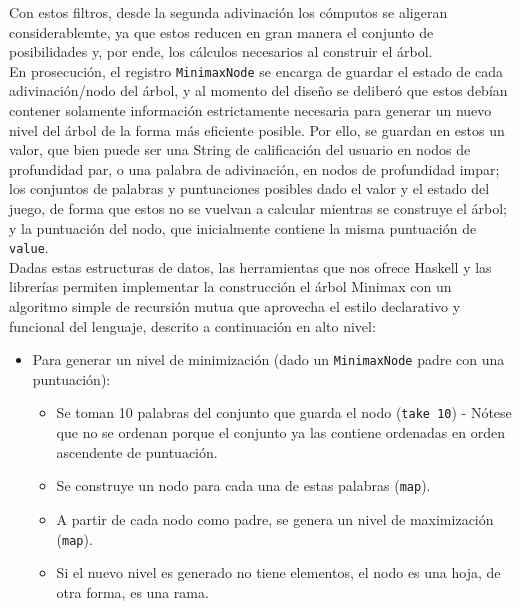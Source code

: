 \documentclass[11pt]{article}
\begin{document}
Con estos filtros, desde la segunda adivinación los cómputos se aligeran
considerablemte, ya que estos reducen en gran manera el conjunto de posibilidades
y, por ende, los cálculos necesarios al construir el árbol. \\

En prosecución, el registro \texttt{MinimaxNode} se encarga de guardar el estado de
cada adivinación/nodo del árbol, y al momento del diseño se deliberó que estos
debían contener solamente información estrictamente necesaria para generar
un nuevo nivel del árbol de la forma más eficiente posible. Por ello, se guardan
en estos un valor, que bien puede ser una String de calificación del usuario en
nodos de profundidad par, o una palabra de adivinación, en nodos de profundidad
impar; los conjuntos de palabras y puntuaciones posibles dado el valor y el estado
del juego, de forma que estos no se vuelvan a calcular mientras se construye el
árbol; y la puntuación del nodo, que inicialmente contiene la misma puntuación de
\texttt{value}. \\

Dadas estas estructuras de datos, las herramientas que nos ofrece Haskell y las
librerías permiten implementar la construcción el árbol Minimax con un algoritmo 
simple de recursión mutua que aprovecha el estilo declarativo y funcional del
lenguaje, descrito a continuación en alto nivel:

\begin{itemize}
   \item Para generar un nivel de minimización (dado un \texttt{MinimaxNode} padre con una puntuación):
   \begin{itemize}
      \item Se toman 10 palabras del conjunto que guarda el nodo (\texttt{take 10}) - Nótese que no se ordenan porque el conjunto ya las contiene ordenadas en orden ascendente de puntuación.
      \item Se construye un nodo para cada una de estas palabras (\texttt{map}).
      \item A partir de cada nodo como padre, se genera un nivel de maximización (\texttt{map}).
      \item Si el nuevo nivel es generado no tiene elementos, el nodo es una hoja, de otra forma, es una rama.
   \end{itemize}
\end{itemize}

\pagebreak
\end{document}
